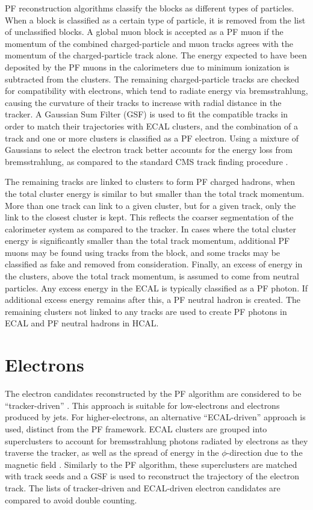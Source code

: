 PF reconstruction algorithms classify the blocks as different types of particles. When a block is classified as a certain type of particle, it is removed from the list of unclassified blocks. A global muon block is accepted as a PF muon if the momentum of the combined charged-particle and muon tracks agrees with the momentum of the charged-particle track alone. The energy expected to have been deposited by the PF muons in the calorimeters due to minimum ionization is subtracted from the clusters. The remaining charged-particle tracks are checked for compatibility with electrons, which tend to radiate energy via bremsstrahlung, causing the curvature of their tracks to increase with radial distance in the tracker. A Gaussian Sum Filter (GSF) is used to fit the compatible tracks in order to match their trajectories with ECAL clusters, and the combination of a track and one or more clusters is classified as a PF electron. Using a mixture of Gaussians to select the electron track better accounts for the energy loss from bremsstrahlung, as compared to the standard CMS track finding procedure \cite{ElectronGSF}.

The remaining tracks are linked to clusters to form PF charged hadrons, when the total cluster energy is similar to but smaller than the total track momentum. More than one track can link to a given cluster, but for a given track, only the link to the closest cluster is kept. This reflects the coarser segmentation of the calorimeter system as compared to the tracker. In cases where the total cluster energy is significantly smaller than the total track momentum, additional PF muons may be found using tracks from the block, and some tracks may be classified as fake and removed from consideration. Finally, an excess of energy in the clusters, above the total track momentum, is assumed to come from neutral particles. Any excess energy in the ECAL is typically classified as a PF photon. If additional excess energy remains after this, a PF neutral hadron is created. The remaining clusters not linked to any tracks are used to create PF photons in ECAL and PF neutral hadrons in HCAL.

\section{Electrons
\label{sec:ele-reco}}

The electron candidates reconstructed by the PF algorithm are considered to be ``tracker-driven'' \cite{CMS-PAS-EGM-10-004}. This approach is suitable for low-\pt electrons and electrons produced by jets. For higher-\pt electrons, an alternative ``ECAL-driven'' approach is used, distinct from the PF framework. ECAL clusters are grouped into superclusters to account for bremsstrahlung photons radiated by electrons as they traverse the tracker, as well as the spread of energy in the $\phi$-direction due to the magnetic field \cite{ElectronReco}. Similarly to the PF algorithm, these superclusters are matched with track seeds and a GSF is used to reconstruct the trajectory of the electron track. The lists of tracker-driven and ECAL-driven electron candidates are compared to avoid double counting.

